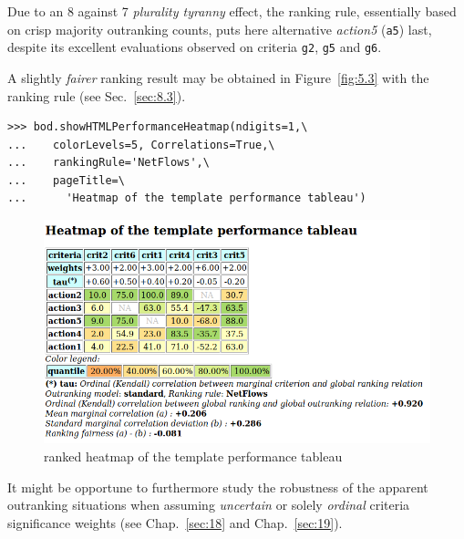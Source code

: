 Due to an 8 against 7 \emph{plurality tyranny} effect, the \Copeland ranking rule, essentially based on crisp majority outranking counts, puts here alternative \emph{action5} (\texttt{a5}) last, despite its excellent evaluations observed on criteria \texttt{g2}, \texttt{g5} and \texttt{g6}.

A slightly \emph{fairer} ranking result may be obtained in Figure~\vref{fig:5.3} with the \NetFlows ranking rule (see Sec.~\ref{sec:8.3}).
\begin{lstlisting}
>>> bod.showHTMLPerformanceHeatmap(ndigits=1,\
...    colorLevels=5, Correlations=True,\
...    rankingRule='NetFlows',\
...    pageTitle=\
...      'Heatmap of the template performance tableau')
\end{lstlisting}
\begin{figure}[ht]
\includegraphics[width=\hsize]{Figures/5-3-templateHeatmapNF.png}
\caption{\NetFlows ranked heatmap of the template performance tableau}
\label{fig:5.3}       %
\end{figure}

It might be opportune to furthermore study the robustness of the apparent outranking situations when assuming \emph{uncertain} or solely \emph{ordinal} criteria significance weights (see Chap.~\ref{sec:18} and Chap.~\ref{sec:19}). 
 
%


